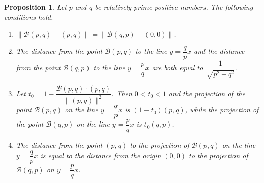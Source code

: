 \documentclass[12pt,english]{article}
\newcommand{\B}{\mathcal B}
\newcommand{\F}{\mathcal F}
\newtheorem{proposition}[theorem]{Proposition}
\begin{document}
\begin{proposition}\label{mainprop}
Let $p$ and $q$ be relatively prime positive numbers. The following conditions hold.
   \begin{enumerate}
    \item  $\|\B(p,q)-(p,q)\|=\|\B(q,p)-(0,0)\|$.
    \item The distance from the point $\B(p,q)$ to the line $y=\dfrac{q}{p}x$  and the distance from the point $\B(q,p)$ to the line $y=\dfrac{p}{q}x$ are both  equal to $\dfrac{1}{\sqrt{p^2+q^2}}$. 
    \item Let $t_0=1-\dfrac{\B(p,q)\cdot (p,q)}{\|(p,q)\|^2}$. Then $0<t_0<1$ and the projection of the point $\B(p,q)$ on the line $y=\dfrac{q}{p}x$ is  $(1-t_0)(p,q)$, while the projection of the point $\B(q,p)$ on the line $y=\dfrac{p}{q}x$ is $t_0(q,p)$. 
    \item The distance from the point $(p,q)$ to the projection of $\B(p,q)$ on the line $y=\dfrac{q}{p}x$ is
    equal to the distance from the origin $(0,0)$ to the projection of $\B(q,p)$  on $y=\dfrac{p}{q}x$.
    \end{enumerate}
\end{proposition}
\end{document}
